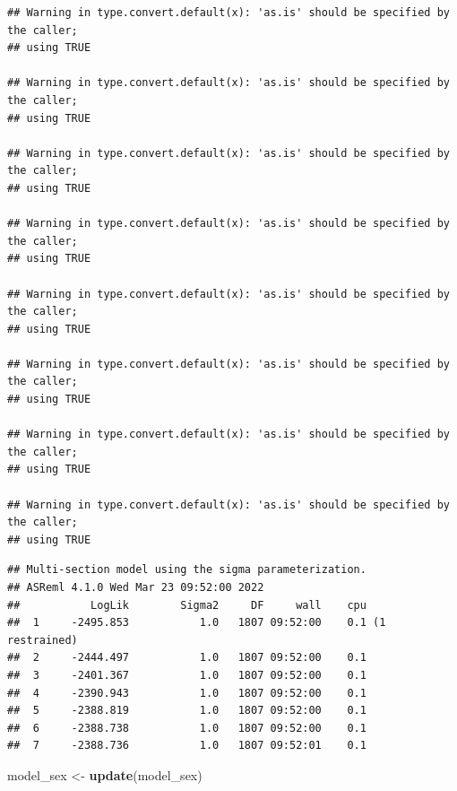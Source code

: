 \documentclass[
  12pt,
]{book}
\newenvironment{Shaded}{\begin{snugshade}}{\end{snugshade}}
\newcommand{\KeywordTok}[1]{\textcolor[rgb]{0.13,0.29,0.53}{\textbf{#1}}}
\newcommand{\NormalTok}[1]{#1}
\newcommand{\StringTok}[1]{\textcolor[rgb]{0.31,0.60,0.02}{#1}}
\begin{document}
\begin{verbatim}
## Warning in type.convert.default(x): 'as.is' should be specified by the caller;
## using TRUE

## Warning in type.convert.default(x): 'as.is' should be specified by the caller;
## using TRUE

## Warning in type.convert.default(x): 'as.is' should be specified by the caller;
## using TRUE

## Warning in type.convert.default(x): 'as.is' should be specified by the caller;
## using TRUE

## Warning in type.convert.default(x): 'as.is' should be specified by the caller;
## using TRUE

## Warning in type.convert.default(x): 'as.is' should be specified by the caller;
## using TRUE

## Warning in type.convert.default(x): 'as.is' should be specified by the caller;
## using TRUE

## Warning in type.convert.default(x): 'as.is' should be specified by the caller;
## using TRUE
\end{verbatim}

\begin{verbatim}
## Multi-section model using the sigma parameterization.
## ASReml 4.1.0 Wed Mar 23 09:52:00 2022
##           LogLik        Sigma2     DF     wall    cpu
##  1     -2495.853           1.0   1807 09:52:00    0.1 (1 restrained)
##  2     -2444.497           1.0   1807 09:52:00    0.1
##  3     -2401.367           1.0   1807 09:52:00    0.1
##  4     -2390.943           1.0   1807 09:52:00    0.1
##  5     -2388.819           1.0   1807 09:52:00    0.1
##  6     -2388.738           1.0   1807 09:52:00    0.1
##  7     -2388.736           1.0   1807 09:52:01    0.1
\end{verbatim}

\begin{Shaded}
\begin{Highlighting}[]
\NormalTok{model\_sex \textless{}{-}}\StringTok{ }\KeywordTok{update}\NormalTok{(model\_sex)}
\end{Highlighting}
\end{Shaded}
\end{document}
